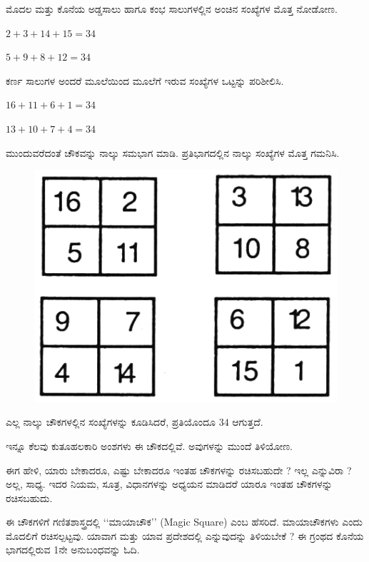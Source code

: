 ಮೊದಲ ಮತ್ತು ಕೊನೆಯ ಅಡ್ಡಸಾಲು ಹಾಗೂ ಕಂಭ ಸಾಲುಗಳಲ್ಲಿನ ಅಂಚಿನ ಸಂಖ್ಯೆಗಳ ಮೊತ್ತ ನೋಡೋಣ.

$2+3+14+15 = 34$

$5+9+8+12 = 34$

\noindent 
ಕರ್ಣ ಸಾಲುಗಳ ಅಂದರೆ ಮೂಲೆಯಿಂದ ಮೂಲೆಗೆ ಇರುವ ಸಂಖ್ಯೆಗಳ ಒಟ್ಟನ್ನು ಪರಿಶೀಲಿಸಿ.

$16+11+6+1 = 34$

$13+10+7+4 = 34$

ಮುಂದುವರೆದಂತೆ ಚೌಕವನ್ನು ನಾಲ್ಕು ಸಮಭಾಗ ಮಾಡಿ. ಪ್ರತಿಭಾಗದಲ್ಲಿನ ನಾಲ್ಕು \break ಸಂಖ್ಯೆಗಳ ಮೊತ್ತ ಗಮನಿಸಿ.
\begin{figure}[H]
\includegraphics{src/figures/chap1/fig1-2.jpg}
\end{figure}
ಎಲ್ಲ ನಾಲ್ಕು ಚೌಕಗಳಲ್ಲಿನ ಸಂಖ್ಯೆಗಳನ್ನು ಕೂಡಿಸಿದರೆ, ಪ್ರತಿಯೊಂದೂ $34$ ಆಗುತ್ತದೆ.

ಇನ್ನೂ ಕೆಲವು ಕುತೂಹಲಕಾರಿ ಅಂಶಗಳು ಈ ಚೌಕದಲ್ಲಿವೆ. ಅವುಗಳನ್ನು ಮುಂದೆ \break ತಿಳಿಯೋಣ.

ಈಗ ಹೇಳಿ, ಯಾರು ಬೇಕಾದರೂ, ಎಷ್ಟು ಬೇಕಾದರೂ ಇಂತಹ ಚೌಕಗಳನ್ನು ರಚಿಸ\-ಬಹುದೇ ? ಇಲ್ಲ ಎನ್ನುವಿರಾ ? ಅಲ್ಲ, ಸಾಧ್ಯ. ಇದರ ನಿಯಮ, ಸೂತ್ರ, ವಿಧಾನಗಳನ್ನು ಅಧ್ಯಯನ ಮಾಡಿದರೆ ಯಾರೂ ಇಂತಹ ಚೌಕಗಳನ್ನು ರಚಿಸಬಹುದು.

ಈ ಚೌಕಗಳಿಗೆ ಗಣಿತಶಾಸ್ತ್ರದಲ್ಲಿ ‘‘ಮಾಯಾಚೌಕ’’ (Magic Square) ಎಂಬ ಹೆಸರಿದೆ. ಮಾಯಾಚೌಕಗಳು ಎಂದು ಮೊದಲಿಗೆ ರಚಿಸಲ್ಪಟ್ಟವು. ಯಾವಾಗ ಮತ್ತು ಯಾವ ಪ್ರದೇಶದಲ್ಲಿ ಎನ್ನುವುದನ್ನು ತಿಳಿಯಬೇಕೆ ? ಈ ಗ್ರಂಥದ ಕೊನೆಯ ಭಾಗದಲ್ಲಿರುವ 1ನೇ ಅನುಬಂಧವನ್ನು ಓದಿ.
